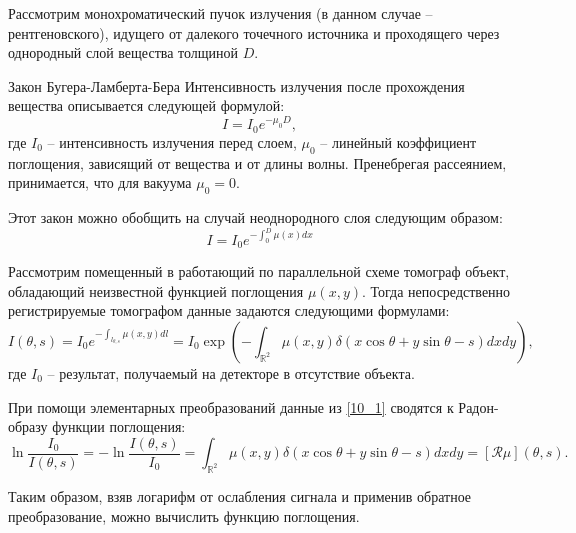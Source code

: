 
Рассмотрим монохроматический пучок излучения (в данном случае -- рентгеновского), идущего от далекого точечного источника и проходящего через однородный слой вещества толщиной $D$.
\begin{statement}{Закон Бугера-Ламберта-Бера}
    Интенсивность излучения после прохождения вещества описывается следующей формулой:
    \begin{equation*}
        I = I_0 e^{-\mu_0 D},
    \end{equation*}
    где $I_0$ -- интенсивность излучения перед слоем, $\mu_0$ -- линейный коэффициент поглощения, зависящий от вещества и от длины волны. Пренебрегая рассеянием, принимается, что для вакуума $\mu_0 = 0$.
\end{statement}

Этот закон можно обобщить на случай неоднородного слоя следующим образом:
\begin{equation*}
    I = I_0 e^{-\int_0^D \mu(x) dx}
\end{equation*}

Рассмотрим помещенный в работающий по параллельной схеме томограф объект, обладающий неизвестной функцией поглощения $\mu(x, y)$. Тогда непосредственно регистрируемые томографом данные задаются следующими формулами:
\begin{equation}
\label{10_1}
    I(\theta, s) =
    I_0 e^{-\int_{l_{\theta, s}} \mu(x, y) dl} =
    I_0 \exp\left( -\int_{\mathbb{R}^2} \mu(x, y) \delta(x\cos\theta + y\sin\theta - s) dx dy \right),
\end{equation}
где $I_0$ -- результат, получаемый на детекторе в отсутствие объекта.

При помощи элементарных преобразований данные из \eqref{10_1} сводятся к Радон-образу функции поглощения:
\begin{equation*}
    \ln \frac{I_0}{I(\theta, s)} =
    -\ln \frac{I(\theta, s)}{I_0} =
    \int_{\mathbb{R}^2} \mu(x, y) \delta(x\cos\theta + y\sin\theta - s) dx dy =
    \left[ \mathcal{R}\mu \right](\theta, s).
\end{equation*}

Таким образом, взяв логарифм от ослабления сигнала и применив обратное преобразование, можно вычислить функцию поглощения.
